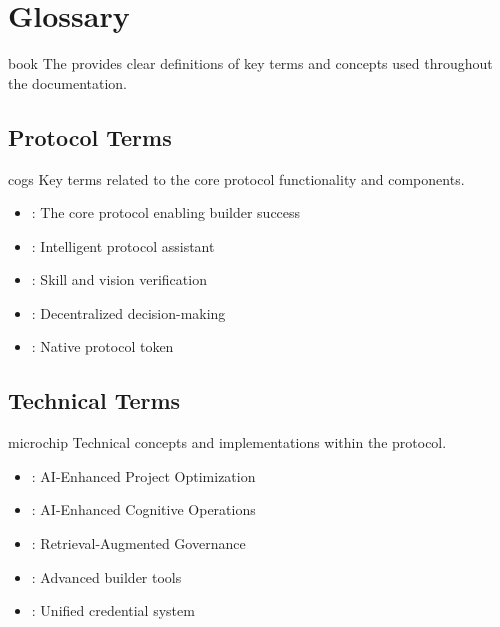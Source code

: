 \section{Glossary}

\begin{mfai-box}{book}
The  provides clear definitions of key terms and concepts used throughout the  documentation.
\end{mfai-box}

\subsection{Protocol Terms}

\begin{mfai-box-learn}{cogs}
Key terms related to the core protocol functionality and components.
\end{mfai-box-learn}

\begin{itemize}[leftmargin=*]
\item {}: The core protocol enabling builder success
\item {}: Intelligent protocol assistant
\item {}: Skill and vision verification
\item {}: Decentralized decision-making
\item {}: Native protocol token
\end{itemize}

\subsection{Technical Terms}

\begin{mfai-box-build}{microchip}
Technical concepts and implementations within the protocol.
\end{mfai-box-build}

\begin{itemize}[leftmargin=*]
\item {}: AI-Enhanced Project Optimization
\item {}: AI-Enhanced Cognitive Operations
\item {}: Retrieval-Augmented Governance
\item {}: Advanced builder tools
\item {}: Unified credential system
\end{itemize}


